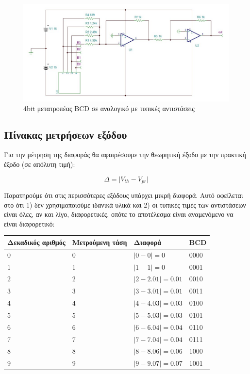 \documentclass[12pt]{article}
\begin{document}
\begin{figure}[H]
	\centering
	\includegraphics[width=\linewidth]{./res/schem_pract.jpg}
	\caption{4bit μετατροπέας BCD σε αναλογικό με τυπικές αντιστάσεις}
\end{figure}

\subsection{Πίνακας μετρήσεων εξόδου}

Για την μέτρηση της διαφοράς θα αφαιρέσουμε την θεωρητική έξοδο με την πρακτική
έξοδο (σε απόλυτη τιμή):

\[Δ = \lvert V_{th} - V_{pr} \lvert\]

Παρατηρούμε ότι στις περισσότερες εξόδους υπάρχει μικρή διαφορά. Αυτό οφείλεται
στο ότι 1) δεν χρησιμοποιούμε ιδανικά υλικά και 2) οι τυπικές τιμές των
αντιστάσεων είναι όλες, αν και λίγο, διαφορετικές, οπότε το αποτέλεσμα είναι
αναμενόμενο να είναι διαφορετικό:

\begin{center}
\begin{tabular}{|p{3cm}|p{3cm}|l|l|}
	\hline
	\textbf{Δεκαδικός αριθμός} & \textbf{Μετρούμενη τάση} & \textbf{Διαφορά} & \textbf{BCD} \\   	
	\hline
	0 & 0 & $\lvert 0-0 \lvert = 0$ & 0000 \\
	\hline
	1 & 1 & $\lvert 1-1 \lvert = 0$ & 0001 \\
	\hline
	2 & 2 & $\lvert 2-2.01 \lvert = 0.01$ & 0010 \\
	\hline
	3 & 3 & $\lvert 3-3.01 \lvert = 0.01$ & 0011 \\
	\hline
	4 & 4 & $\lvert 4-4.03 \lvert = 0.03$ & 0100 \\
	\hline
	5 & 5 & $\lvert 5-5.03 \lvert = 0.03$ & 0101 \\
	\hline
	6 & 6 & $\lvert 6-6.04 \lvert = 0.04$ & 0110 \\
	\hline
	7 & 7 & $\lvert 7-7.04 \lvert = 0.04$ & 0111 \\
	\hline
	8 & 8 & $\lvert 8-8.06 \lvert = 0.06$ & 1000 \\
	\hline
	9 & 9 & $\lvert 9-9.07 \lvert = 0.07$ & 1001 \\
	\hline
\end{tabular}
\end{center}
\end{document}
